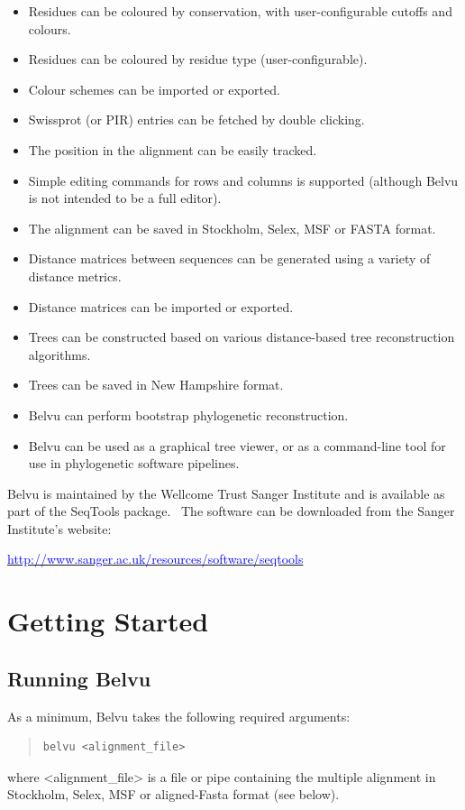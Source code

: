 \documentclass[letterpaper]{article}
\newcommand\textstyleInternetlink[1]{\textcolor{blue}{#1}}
\begin{document}
\begin{itemize}
\item Residues can be coloured by conservation, with user-configurable cutoffs and colours.
\item Residues can be coloured by residue type (user-configurable).
\item Colour schemes can be imported or exported.
\item Swissprot (or PIR) entries can be fetched by double clicking.
\item The position in the alignment can be easily tracked.
\item Simple editing commands for rows and columns is supported (although Belvu is not intended to be a full editor).
\item The alignment can be saved in Stockholm, Selex, MSF or FASTA format.
\item Distance matrices between sequences can be generated using a variety of distance metrics.
\item Distance matrices can be imported or exported.
\item Trees can be constructed based on various distance-based tree reconstruction algorithms.
\item Trees can be saved in New Hampshire format.
\item Belvu can perform bootstrap phylogenetic reconstruction.
\item Belvu can be used as a graphical tree viewer, or as a command-line tool for use in phylogenetic software pipelines.
\end{itemize}

Belvu is maintained by the Wellcome Trust Sanger Institute and is available as part of the SeqTools package. \ The software can be downloaded from the Sanger Institute{\textquoteright}s website: 

\href{http://www.sanger.ac.uk/resources/software/seqtools/}
{\textstyleInternetlink{http://www.sanger.ac.uk/resources/software/seqtools}}

\clearpage\section[Getting Started]{Getting Started}
\subsection[Running Belvu]{Running Belvu}
As a minimum, Belvu takes the following required arguments:
\begin{quote}
\begin{verbatim}belvu <alignment_file>
\end{verbatim}
\end{quote}
 where {\textless}alignment\_file{\textgreater} is a file or pipe containing the multiple alignment in Stockholm, Selex, MSF or aligned-Fasta format (see below).
\end{document}
